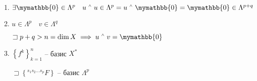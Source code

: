 \documentclass{book}
\let\latexwedge\wedge
\def\wedge{\,\raisebox{0.5ex}{\ensuremath{\scriptscriptstyle\latexwedge}\,}}
\theoremstyle{definition}
\newtheorem*{note}{Замечание}
\begin{document}
\begin{enumerate}
      \begin{note}
          $u\wedge v = (-1)^{p_1p_2}v\wedge u$
     \end{note}
     \begin{proof}
            \begin{align*}                
                &\sphericalangle \left[u\wedge v\right]\left( x_1, x_2, .., x_{p_1}, x_{p_1+1}, \ldots, x_{p_1+p_2} \right)=\\
                 &=\frac{(p_1+p_2)!}{p_1!p_2!}\frac{1}{(p_1+p_2)!}\sum_{\sigma}(-1)^{\left[ \sigma \right] }u\left( x_{\sigma(1)} \ldots x_{\sigma(p_1)} \right) v\left( x_{\sigma(p_1+1)} \ldots x_{\sigma(p_1+p_2)}  \right)  =\\
                                                                                                                          &= \frac{(p_1+p_2)!}{p_1!p_2!}\frac{(-1)^{p_1p_2}}{(p_1+p_2)!}\sum_{\sigma}(-1)^{\left[ \sigma \right] } v\left( x_{\sigma(p_1)} \ldots x_{\sigma(p_1+p_2)} \right) \cdot  u\left( x_{\sigma(1)}, \ldots, x_{\sigma(p_1)} \right)    =\\
                                                                                                                          &= (-1)^{p_1p_2}\left( v\wedge u \right) \left( x_1, \ldots, x_{p_1+p_2} \right)  \\
            .\end{align*}
     \end{proof}    
     \begin{note}
         $\sqsupset f, g\in \Lambda^1\quad f\wedge g = -g\wedge f$
     \end{note}
 \item $\exists \mymathbb{0}\in\Lambda^p \quad u\wedge u\in \Lambda^p = u\wedge \mymathbb{0} = \mymathbb{0}\in\Lambda^{p+q}$
 \item $u\in\Lambda^p\quad v\in \Lambda^q$

     $\sqsupset p+q>n = \dim X \implies u\wedge v = \mymathbb{0}$
 \item $\left\{ f^k \right\} _{k=1}^n$ -- базис $X^*$

     $\sqsupset \left\{ ^{s_1s_2\ldots s_p}F \right\} $ -- базис $\Lambda^p$


\end{enumerate}
\end{document}
